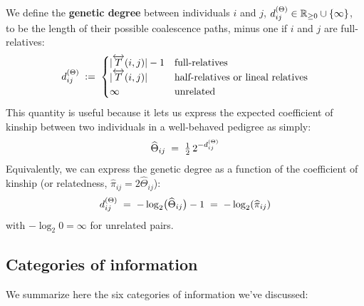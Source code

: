 \documentclass[12pt]{article}
\numberwithin{equation}{section}
\begin{document}
We define the \textbf{genetic degree} between individuals $i$ and $j$, $d^{(\Theta)}_{ij} \in \mathbb{R}_{\geq 0} \cup \{\infty\}$, to be the length of their possible coalescence paths, minus one if $i$ and $j$ are full-relatives:
\begin{equation}\label{eq:genetic-degree}
    d^{(\Theta)}_{ij} \;:=\;
    \begin{cases}
        |\overleftrightarrow{T}(i,j)| - 1 & \text{full-relatives} \\
        |\overleftrightarrow{T}(i,j)| & \text{half-relatives or lineal relatives} \\
        \infty & \text{unrelated}
    \end{cases}
\end{equation}
This quantity is useful because it lets us express the expected coefficient of kinship between two individuals in a well-behaved pedigree as simply:
\begin{equation}\label{eq:kinship-degree}
    \widehat\Theta_{ij} \;=\; \tfrac12\, 2^{-d^{(\Theta)}_{ij}}
\end{equation}
Equivalently, we can express the genetic degree as a function of the coefficient of kinship (or relatedness, $\widehat\pi_{ij} = 2\widehat\Theta_{ij}$):
\begin{equation}\label{eq:degree-kinship}
    d^{(\Theta)}_{ij} \;=\; -\log_2\!\big(\widehat\Theta_{ij}\big) - 1 \;=\; -\log_2 (\widehat\pi_{ij})
\end{equation}
with $-\log_2 0 = \infty$ for unrelated pairs.

\subsection{Categories of information}
We summarize here the six categories of information we've discussed:
\end{document}

